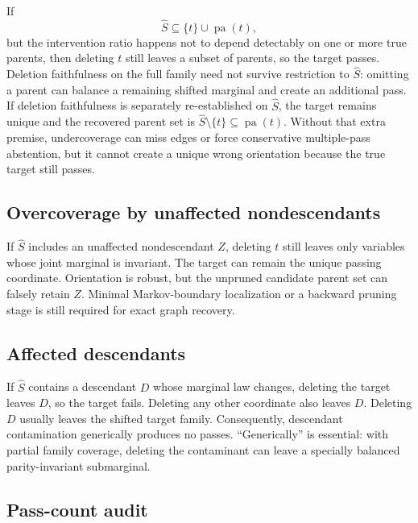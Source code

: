 \documentclass[11pt]{article}
\newcommand{\pa}{\operatorname{pa}}
\begin{document}
If
\begin{equation}
\widehat S\subseteq\{t\}\cup\pa(t),
\end{equation}
but the intervention ratio happens not to depend detectably on one or more true parents, then deleting \(t\) still leaves a subset of parents, so the target passes.  Deletion faithfulness on the full family need not survive restriction to \(\widehat S\): omitting a parent can balance a remaining shifted marginal and create an additional pass.  If deletion faithfulness is separately re-established on \(\widehat S\), the target remains unique and the recovered parent set is \(\widehat S\setminus\{t\}\subseteq\pa(t)\).  Without that extra premise, undercoverage can miss edges or force conservative multiple-pass abstention, but it cannot create a unique wrong orientation because the true target still passes.

\subsection{Overcoverage by unaffected nondescendants}

If \(\widehat S\) includes an unaffected nondescendant \(Z\), deleting \(t\) still leaves only variables whose joint marginal is invariant.  The target can remain the unique passing coordinate.  Orientation is robust, but the unpruned candidate parent set can falsely retain \(Z\).  Minimal Markov-boundary localization or a backward pruning stage is still required for exact graph recovery.

\subsection{Affected descendants}

If \(\widehat S\) contains a descendant \(D\) whose marginal law changes, deleting the target leaves \(D\), so the target fails.  Deleting any other coordinate also leaves \(D\).  Deleting \(D\) usually leaves the shifted target family.  Consequently, descendant contamination generically produces no passes.  ``Generically'' is essential: with partial family coverage, deleting the contaminant can leave a specially balanced parity-invariant submarginal.

\subsection{Pass-count audit}
\end{document}
